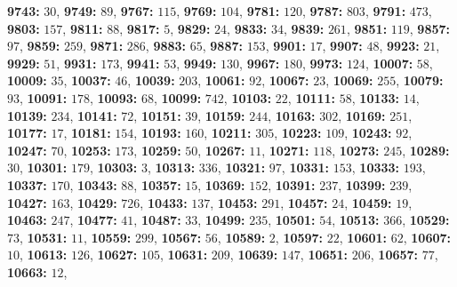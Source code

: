 \textsf{\bfseries 9743:} $30$, \textsf{\bfseries 9749:} $89$, \textsf{\bfseries 9767:} $115$, \textsf{\bfseries 9769:} $104$, \textsf{\bfseries 9781:} $120$, \textsf{\bfseries 9787:} $803$, \textsf{\bfseries 9791:} $473$, \textsf{\bfseries 9803:} $157$, \textsf{\bfseries 9811:} $88$, \textsf{\bfseries 9817:} $5$, \textsf{\bfseries 9829:} $24$, \textsf{\bfseries 9833:} $34$, \textsf{\bfseries 9839:} $261$, \textsf{\bfseries 9851:} $119$, \textsf{\bfseries 9857:} $97$, \textsf{\bfseries 9859:} $259$, \textsf{\bfseries 9871:} $286$, \textsf{\bfseries 9883:} $65$, \textsf{\bfseries 9887:} $153$, \textsf{\bfseries 9901:} $17$, \textsf{\bfseries 9907:} $48$, \textsf{\bfseries 9923:} $21$, \textsf{\bfseries 9929:} $51$, \textsf{\bfseries 9931:} $173$, \textsf{\bfseries 9941:} $53$, \textsf{\bfseries 9949:} $130$, \textsf{\bfseries 9967:} $180$, \textsf{\bfseries 9973:} $124$, \textsf{\bfseries 10007:} $58$, \textsf{\bfseries 10009:} $35$, \textsf{\bfseries 10037:} $46$, \textsf{\bfseries 10039:} $203$, \textsf{\bfseries 10061:} $92$, \textsf{\bfseries 10067:} $23$, \textsf{\bfseries 10069:} $255$, \textsf{\bfseries 10079:} $93$, \textsf{\bfseries 10091:} $178$, \textsf{\bfseries 10093:} $68$, \textsf{\bfseries 10099:} $742$, \textsf{\bfseries 10103:} $22$, \textsf{\bfseries 10111:} $58$, \textsf{\bfseries 10133:} $14$, \textsf{\bfseries 10139:} $234$, \textsf{\bfseries 10141:} $72$, \textsf{\bfseries 10151:} $39$, \textsf{\bfseries 10159:} $244$, \textsf{\bfseries 10163:} $302$, \textsf{\bfseries 10169:} $251$, \textsf{\bfseries 10177:} $17$, \textsf{\bfseries 10181:} $154$, \textsf{\bfseries 10193:} $160$, \textsf{\bfseries 10211:} $305$, \textsf{\bfseries 10223:} $109$, \textsf{\bfseries 10243:} $92$, \textsf{\bfseries 10247:} $70$, \textsf{\bfseries 10253:} $173$, \textsf{\bfseries 10259:} $50$, \textsf{\bfseries 10267:} $11$, \textsf{\bfseries 10271:} $118$, \textsf{\bfseries 10273:} $245$, \textsf{\bfseries 10289:} $30$, \textsf{\bfseries 10301:} $179$, \textsf{\bfseries 10303:} $3$, \textsf{\bfseries 10313:} $336$, \textsf{\bfseries 10321:} $97$, \textsf{\bfseries 10331:} $153$, \textsf{\bfseries 10333:} $193$, \textsf{\bfseries 10337:} $170$, \textsf{\bfseries 10343:} $88$, \textsf{\bfseries 10357:} $15$, \textsf{\bfseries 10369:} $152$, \textsf{\bfseries 10391:} $237$, \textsf{\bfseries 10399:} $239$, \textsf{\bfseries 10427:} $163$, \textsf{\bfseries 10429:} $726$, \textsf{\bfseries 10433:} $137$, \textsf{\bfseries 10453:} $291$, \textsf{\bfseries 10457:} $24$, \textsf{\bfseries 10459:} $19$, \textsf{\bfseries 10463:} $247$, \textsf{\bfseries 10477:} $41$, \textsf{\bfseries 10487:} $33$, \textsf{\bfseries 10499:} $235$, \textsf{\bfseries 10501:} $54$, \textsf{\bfseries 10513:} $366$, \textsf{\bfseries 10529:} $73$, \textsf{\bfseries 10531:} $11$, \textsf{\bfseries 10559:} $299$, \textsf{\bfseries 10567:} $56$, \textsf{\bfseries 10589:} $2$, \textsf{\bfseries 10597:} $22$, \textsf{\bfseries 10601:} $62$, \textsf{\bfseries 10607:} $10$, \textsf{\bfseries 10613:} $126$, \textsf{\bfseries 10627:} $105$, \textsf{\bfseries 10631:} $209$, \textsf{\bfseries 10639:} $147$, \textsf{\bfseries 10651:} $206$, \textsf{\bfseries 10657:} $77$, \textsf{\bfseries 10663:} $12$, 
